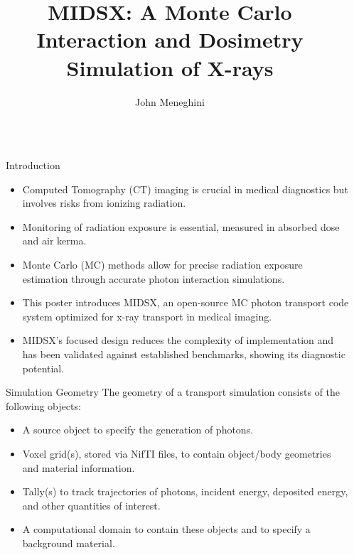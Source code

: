 \documentclass[final]{beamer}
\title{MIDSX: A Monte Carlo Interaction and Dosimetry Simulation of X-rays}
\author{John Meneghini}
\institute[shortinst]{Department of Physics, Saint Vincent College, Latrobe, PA 15650}
\newlength{\sepwidth}
\newlength{\colwidth}
\newcommand{\separatorcolumn}{\begin{column}{\sepwidth}\end{column}}
\begin{document}
\begin{frame}[t]
\begin{columns}[t]
\separatorcolumn

\begin{column}{\colwidth}

  \begin{block}{Introduction}
    \begin{itemize}
      \item Computed Tomography (CT) imaging is crucial in medical diagnostics but involves risks from ionizing radiation.
      \item Monitoring of radiation exposure is essential, measured in absorbed dose and air kerma.
      \item Monte Carlo (MC) methods allow for precise radiation exposure estimation through accurate photon interaction simulations.
      \item This poster introduces MIDSX, an open-source MC photon transport code system optimized for x-ray transport in medical imaging.
      \item MIDSX's focused design reduces the complexity of implementation and has been validated against established
      benchmarks, showing its diagnostic potential.
    \end{itemize}
  
  \end{block}

  \begin{block}{Simulation Geometry}
    The geometry of a transport simulation consists of the following objects:
    \begin{itemize}
      \item A source object to specify the generation of photons.
      \item Voxel grid(s), stored via NifTI files, to contain object/body geometries and material information.
      \item Tally(s) to track trajectories of photons, incident energy, deposited energy, and other quantities of interest.
      \item A computational domain to contain these objects and to specify a background material.
    \end{itemize}


\end{block}
\end{column}
\end{columns}
\end{frame}
\end{document}
